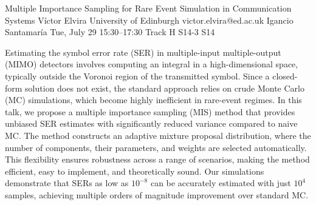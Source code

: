 \begin{talk}
  {Multiple Importance Sampling for Rare Event Simulation in Communication Systems}%
  {V\'ictor Elvira}%
  {University of Edinburgh}%
  {victor.elvira@ed.ac.uk}%
  {Igancio Santamar\'ia}%
  {}%
  {Tue, July 29 15:30–17:30 Track H}%
  {S14-3}%
  {S14}%
  
				
			
Estimating the symbol error rate (SER) in multiple-input multiple-output (MIMO) detectors involves computing an integral in a high-dimensional space, typically outside the Voronoi region of the transmitted symbol. Since a closed-form solution does not exist, the standard approach relies on crude Monte Carlo (MC) simulations, which become highly inefficient in rare-event regimes.  In this talk, we propose a multiple importance sampling (MIS) method that provides unbiased SER estimates with significantly reduced variance compared to naive MC. The method constructs an adaptive mixture proposal distribution, where the number of components, their parameters, and weights are selected automatically. This flexibility ensures robustness across a range of scenarios, making the method efficient, easy to implement, and theoretically sound. Our simulations demonstrate that SERs as low as $10^{-8}$ can be accurately estimated with just $10^4$ samples, achieving multiple orders of magnitude improvement over standard MC.
\medskip


\end{talk}

